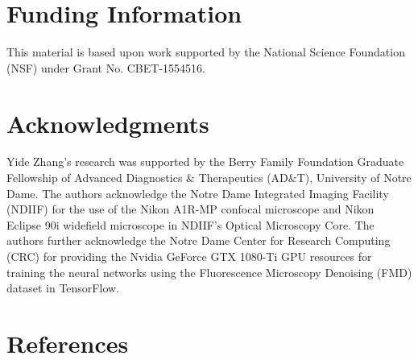 \documentclass[12pt]{iopart}
\begin{document}
\section*{Funding Information}
This material is based upon work supported by the National Science Foundation (NSF) under Grant No. CBET-1554516.

\section*{Acknowledgments}
Yide Zhang’s research was supported by the Berry Family Foundation Graduate Fellowship of Advanced Diagnostics $\&$ Therapeutics (AD$\&$T), University of Notre Dame. The authors acknowledge the Notre Dame Integrated Imaging Facility (NDIIF) for the use of the Nikon A1R-MP confocal microscope and Nikon Eclipse 90i widefield microscope in NDIIF’s Optical Microscopy Core. The authors further acknowledge the Notre Dame Center for Research Computing (CRC) for providing the Nvidia GeForce GTX 1080-Ti GPU resources for training the neural networks using the Fluorescence Microscopy Denoising (FMD) dataset in TensorFlow.

\section*{References}


\end{document}
